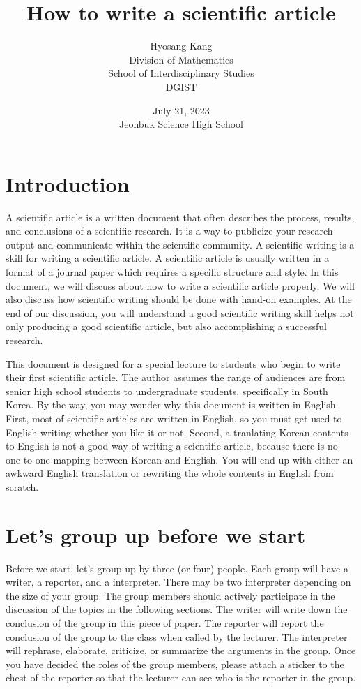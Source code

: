 \documentclass{article}
\title{How to write a scientific article}
\author{
    Hyosang Kang\\
    \small Division of Mathematics\\ 
    \small School of Interdisciplinary Studies\\ 
    \small DGIST
}
\date{
    July 21, 2023\\ 
    \small Jeonbuk Science High School
}
\begin{document}
\maketitle
\thispagestyle{fancy}

\section{Introduction}

A scientific article is a written document that often describes the process, results, and conclusions of a scientific research. 
It is a way to publicize your research output and communicate within the scientific community. 
A scientific writing is a skill for writing a scientific article.
A scientific article is usually written in a format of a journal paper which requires a specific structure and style.
In this document, we will discuss about how to write a scientific article properly.
We will also discuss how scientific writing should be done with hand-on examples.
At the end of our discussion, you will understand a good scientific writing skill helps not only producing a good scientific article, but also accomplishing a successful research. 

This document is designed for a special lecture to students who begin to write their first scientific article.
The author assumes the range of audiences are from senior high school students to undergraduate students, specifically in South Korea.
By the way, you may wonder why this document is written in English.
First, most of scientific articles are written in English, so you must get used to English writing whether you like it or not.
Second, a tranlating Korean contents to English is not a good way of writing a scientific article, because there is no one-to-one mapping between Korean and English. You will end up with either an awkward English translation or rewriting the whole contents in English from scratch.



\section{Let's group up before we start}

Before we start, let's group up by three (or four) people.
Each group will have a writer, a reporter, and a interpreter.
There may be two interpreter depending on the size of your group.
The group members should actively participate in the discussion of the topics in the following sections.
The writer will write down the conclusion of the group in this piece of paper.
The reporter will report the conclusion of the group to the class when called by the lecturer.
The interpreter will rephrase, elaborate, criticize, or summarize the arguments in the group.
Once you have decided the roles of the group members, please attach a sticker to the chest of the reporter so that the lecturer can see who is the reporter in the group.
\end{document}
